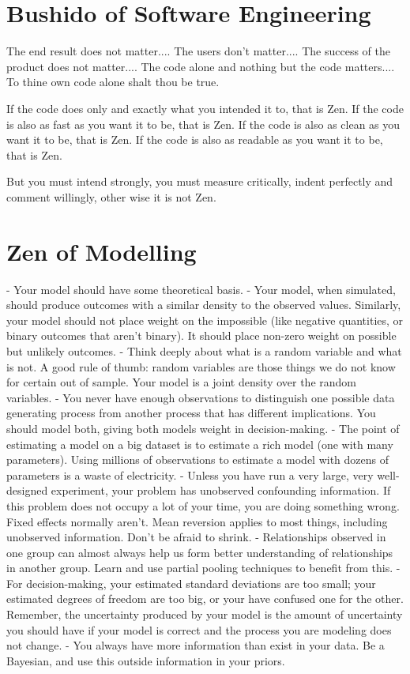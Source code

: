 \section*{Bushido of Software Engineering}

The end result does not matter....
The users don't matter....
The success of the product does not matter....
The code alone and nothing but the code matters....
To thine own code alone shalt thou be true.

If the code does only and exactly what you intended it to, that is Zen.
If the code is also as fast as you want it to be, that is Zen.
If the code is also as clean as you want it to be, that is Zen.
If the code is also as readable as you want it to be, that is Zen.

But you must intend strongly, you must measure critically, indent perfectly and comment willingly, other wise it is not Zen.


\section*{Zen of Modelling}

- Your model should have some theoretical basis.
- Your model, when simulated, should produce outcomes with a similar density to the observed values. Similarly, your model should not place weight on the impossible (like negative quantities, or binary outcomes that aren’t binary). It should place non-zero weight on possible but unlikely outcomes.
- Think deeply about what is a random variable and what is not. A good rule of thumb: random variables are those things we do not know for certain out of sample. Your model is a joint density over the random variables.
- You never have enough observations to distinguish one possible data generating process from another process that has different implications. You should model both, giving both models weight in decision-making.
- The point of estimating a model on a big dataset is to estimate a rich model (one with many parameters). Using millions of observations to estimate a model with dozens of parameters is a waste of electricity.
- Unless you have run a very large, very well-designed experiment, your problem has unobserved confounding information. If this problem does not occupy a lot of your time, you are doing something wrong.
Fixed effects normally aren’t. Mean reversion applies to most things, including unobserved information. Don’t be afraid to shrink.
- Relationships observed in one group can almost always help us form better understanding of relationships in another group. Learn and use partial pooling techniques to benefit from this.
- For decision-making, your estimated standard deviations are too small; your estimated degrees of freedom are too big, or your have confused one for the other. Remember, the uncertainty produced by your model is the amount of uncertainty you should have if your model is correct and the process you are modeling does not change.
- You always have more information than exist in your data. Be a Bayesian, and use this outside information in your priors.


